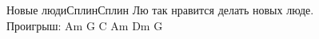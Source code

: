 \documentclass[11pt,a5paper]{book}
\begin{document}
\begin{song}{Новые люди}{}{Сплин}{Сплин}{}{}
Лю так нравится делать новых люде.\\

Проигрыш:  Am G C Am Dm G\\


\begin{SBSection*}
\begin{figure}[b!]
\end{figure}
\end{SBSection*}
\end{song}
\end{document}
